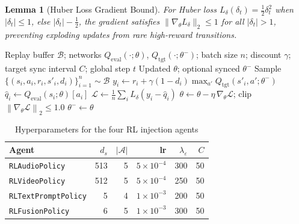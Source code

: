 \documentclass[12pt,a4paper]{article}
\theoremstyle{definition}
\theoremstyle{plain}
\newtheorem{lemma}[theorem]{Lemma}
\theoremstyle{remark}
\newcommand{\Norm}[1]{\left\|#1\right\|_2}
\newcommand{\Loss}{\mathcal{L}}
\begin{document}
\begin{lemma}[Huber Loss Gradient Bound]
For Huber loss $L_\delta(\delta_t) = \tfrac{1}{2}\delta_t^2$ when
$|\delta_t|\le 1$, else $|\delta_t| - \tfrac{1}{2}$, the gradient satisfies
$\|\nabla_\theta L_\delta\|_2 \le 1$ for all $|\delta_t|>1$, preventing
exploding updates from rare high-reward transitions.
\end{lemma}

\begin{algorithm}[H]
\caption{Generic DQN Train Step (shared by all four agents)}
\label{alg:dqn_step}
\begin{algorithmic}[1]
\Require Replay buffer $\mathcal{B}$; networks $Q_{\text{eval}}(\cdot;\theta)$,
         $Q_{\text{tgt}}(\cdot;\theta^-)$; batch size $n$; discount $\gamma$;
         target sync interval $C$; global step $t$
\Ensure Updated $\theta$; optional synced $\theta^-$
 \Return \EndIf
\State Sample $\{(s_i,a_i,r_i,s'_i,d_i)\}_{i=1}^n \sim \mathcal{B}$
\State $y_i \gets r_i + \gamma(1-d_i)\max_{a'}Q_{\text{tgt}}(s'_i,a';\theta^-)$
\State $\hat{q}_i \gets Q_{\text{eval}}(s_i;\theta)[a_i]$
\State $\Loss \gets \frac{1}{n}\sum_i L_\delta(y_i - \hat{q}_i)$
\State $\theta \gets \theta - \eta\,\nabla_\theta\Loss$;
       \quad clip $\Norm{\nabla_\theta\Loss}\le 1.0$
 $\theta^- \gets \theta$ \EndIf
{}
\end{algorithmic}
\end{algorithm}

\begin{table}[H]
\centering
\caption{Hyperparameters for the four RL injection agents}
\label{tab:rl_hyperparams}
\begin{tabular}{lrrrrr}
\toprule
\textbf{Agent} & $d_s$ & $|\mathcal{A}|$ & lr & $\lambda_\varepsilon$ & $C$ \\
\midrule
\texttt{RLAudioPolicy}       & 513 & 5 & $5\times10^{-4}$ & 300 & 50 \\
\texttt{RLVideoPolicy}       & 512 & 5 & $5\times10^{-4}$ & 250 & 50 \\
\texttt{RLTextPromptPolicy}  &   5 & 4 & $1\times10^{-3}$ & 200 & 50 \\
\texttt{RLFusionPolicy}      &   6 & 5 & $1\times10^{-3}$ & 300 & 50 \\
\bottomrule
\end{tabular}
\end{table}
\end{document}
